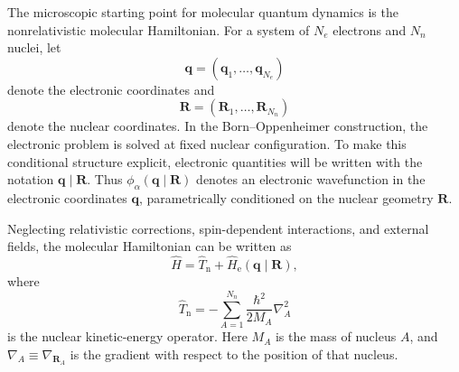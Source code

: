 \documentclass[
  11pt,
  letterpaper,
  onehalfspacing,
  normalmargins,
  equalmargins,
  oneside
]{ut-thesis}
\begin{document}
The microscopic starting point for molecular quantum dynamics is the
nonrelativistic molecular Hamiltonian. For a system of \(N_e\) electrons and
\(N_n\) nuclei, let
\[
\mathbf q=(\mathbf q_1,\ldots,\mathbf q_{N_e})
\]
denote the electronic coordinates and
\[
\mathbf R=(\mathbf R_1,\ldots,\mathbf R_{N_n})
\]
denote the nuclear coordinates. In the Born--Oppenheimer construction, the
electronic problem is solved at fixed nuclear configuration. To make this
conditional structure explicit, electronic quantities will be written with the
notation \(\mathbf q\mid\mathbf R\). Thus
\(\phi_\alpha(\mathbf q\mid\mathbf R)\) denotes an electronic wavefunction in
the electronic coordinates \(\mathbf q\), parametrically conditioned on the
nuclear geometry \(\mathbf R\).

Neglecting relativistic corrections, spin-dependent interactions, and external
fields, the molecular Hamiltonian can be written as
\begin{equation}
\hat H
=
\hat T_{\mathrm n}
+
\hat H_{\mathrm e}(\mathbf q\mid\mathbf R),
\label{eq:full-molecular-hamiltonian}
\end{equation}
where
\begin{equation}
\hat T_{\mathrm n}
=
-\sum_{A=1}^{N_n}
\frac{\hbar^2}{2M_A}
\nabla_A^2
\label{eq:nuclear-kinetic-energy}
\end{equation}
is the nuclear kinetic-energy operator. Here \(M_A\) is the mass of nucleus
\(A\), and \(\nabla_A\equiv\nabla_{\mathbf R_A}\) is the gradient with respect
to the position of that nucleus.
\end{document}
